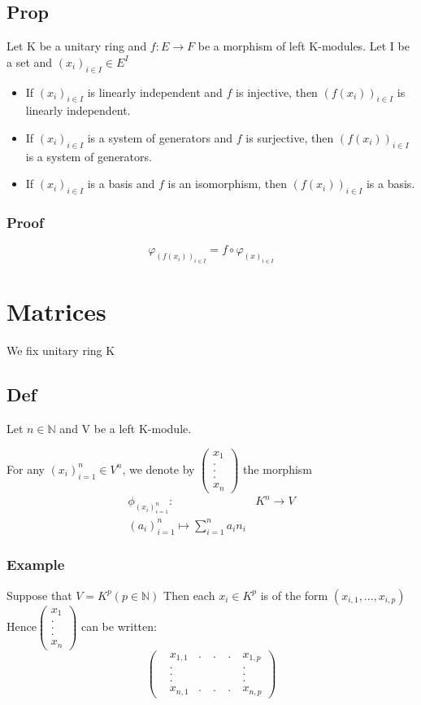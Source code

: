 \documentclass{book}
\begin{document}
\section{Prop}
Let K be a unitary ring and $f:E\rightarrow F$ be a morphism of left K-modules. Let I be a set and $(x_i)_{i\in I}\in E^I$
\begin{itemize}
    \item If $(x_i)_{i\in I}$ is linearly independent and $f$ is injective, then $(f(x_i))_{i\in I}$ is linearly independent.
    \item If $(x_i)_{i\in I}$ is a system of generators and $f$ is surjective, then $(f(x_i))_{i\in I}$ is a system of generators.
    \item If $(x_i)_{i\in I}$ is a basis and $f$ is an isomorphism, then $(f(x_i))_{i\in I}$ is a basis.
\end{itemize}
\subsection{Proof}$$\varphi_{(f(x_i))_{i\in I}}=f\circ\varphi_{(x)_{i\in I}}$$
\chapter{Matrices}
We fix unitary ring K
\section{Def}
Let $n\in \mathbb{N}$ and V be a left K-module.

For any $(x_i)_{i=1}^n\in V^n$, we denote by $\left(\begin{aligned}
    x_1\\.\\.\\.\\x_n
\end{aligned}\right)$ the morphism $$\begin{aligned}
    \phi_{(x_i)_{i=1}^n}: &K^n\rightarrow V\\(a_i)_{i=1}^n\mapsto \sum\limits_{i=1}^n a_in_i
\end{aligned}$$
\subsection{Example}
Suppose that $V=K^p(p\in \mathbb{N})$ Then each $x_i\in K^p$ is of the form $(x_{i,1},...,x_{i,p})$ Hence$\left(\begin{aligned}
    x_1\\.\\.\\.\\x_n
\end{aligned}\right)$ can be written:
$$\left(\begin{aligned}
    &x_{1,1} &.\ &.\ &.\ &x_{1,p}\\ 
    & .& & & &.\\
    & .& & & &.\\
    & .& & & &.\\
    &x_{n,1} &.\ &.\ &.\  &x_{n,p}
\end{aligned}\right)$$
\end{document}
